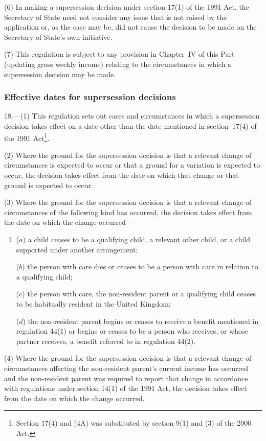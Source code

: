 \documentclass[12pt,a4paper]{article}
\begin{document}
(6) In making a supersession decision under section 17(1) of the 1991 Act, the Secretary of State need not consider any issue that is not raised by the application or, as the case may be, did not cause the decision to be made on the Secretary of State’s own initiative.

(7) This regulation is subject to any provision in Chapter~IV of this Part (updating gross weekly income) relating to the circumstances in which a supersession decision may be made.

\subsubsection[18. Effective dates for supersession decisions]{Effective dates for supersession decisions}

18.---(1)  This regulation sets out cases and circumstances in which a supersession decision takes effect on a date other than the date mentioned in section~17(4) of the 1991 Act\footnote{Section 17(4) and (4A) was substituted by section 9(1) and (3) of the 2000 Act.}.

(2) Where the ground for the supersession decision is that a relevant change of circumstances is expected to occur or that a ground for a variation is expected to occur, the decision takes effect from the date on which that change or that ground is expected to occur.

(3) Where the ground for the supersession decision is that a relevant change of circumstances of the following kind has occurred, the decision takes effect from the date on which the change occurred—
\begin{enumerate}\item[]
($a$) a child ceases to be a qualifying child, a relevant other child, or a child supported under another arrangement;

($b$) the person with care dies or ceases to be a person with care in relation to a qualifying child;

($c$) the person with care, the non-resident parent or a qualifying child ceases to be habitually resident in the United Kingdom;

($d$) the non-resident parent begins or ceases to receive a benefit mentioned in regulation 44(1) or begins or ceases to be a person who receives, or whose partner receives, a benefit referred to in regulation 44(2).
\end{enumerate}

(4) Where the ground for the supersession decision is that a relevant change of circumstances affecting the non-resident parent’s current income has occurred and the non-resident parent was required to report that change in accordance with regulations under section 14(1) of the 1991 Act, the decision takes effect from the date on which the change occurred.
\end{document}
